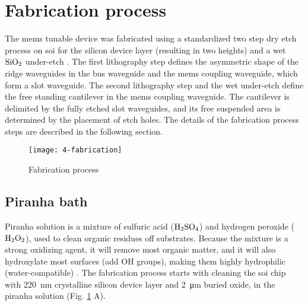 \documentclass[../report.tex]{subfiles}
\begin{document}
\section{Fabrication process}\label{sec:fab_process}
The \gls{mems} tunable device was fabricated using a standardized two step dry etch process on \gls{soi} for the silicon device layer (resulting in two heights) and a wet $\mathrm{SiO_2}$ under-etch \cite{errando-herranz_low-power_2015}. The first lithography step defines the asymmetric shape of the ridge waveguides in the bus waveguide and the \gls{mems} coupling waveguide, which form a slot waveguide. The second lithography step and the wet under-etch define the free standing cantilever in the \gls{mems} coupling waveguide. The cantilever is delimited by the fully etched slot waveguides, and its free suspended area is determined by the placement of etch holes. The details of the fabrication process steps are described in the following section.

\begin{figure}[H] %
	\centering
	\texttt{[image: 4-fabrication]}
	\caption{Fabrication process}
	\label{fig:4_fabrication}
\end{figure}


\subsection{Piranha bath}			
Piranha solution is a mixture of sulfuric acid ($\mathrm{H_2SO_4}$) and hydrogen peroxide ($\mathrm{H_2O_2}$), used to clean organic residues off substrates. Because the mixture is a strong oxidizing agent, it will remove most organic matter, and it will also hydroxylate most surfaces (add OH groups), making them highly hydrophilic (water-compatible) \cite{piranha_bath}. The fabrication process starts with cleaning the \gls{soi} chip with \SI{220}{\nano \meter} crystalline silicon device layer and \SI{2}{\micro \meter} buried oxide, in the piranha solution (Fig. \ref{fig:4_fabrication} A).
 
\end{document}
